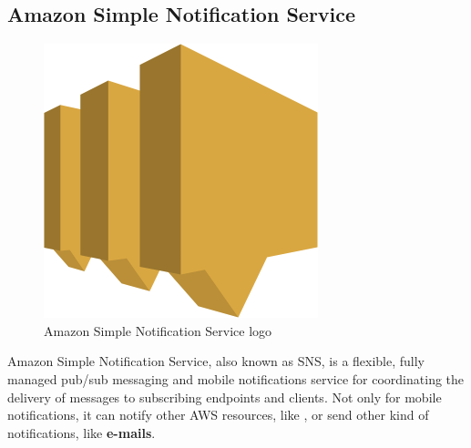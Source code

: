 \subsection*{Amazon Simple Notification Service} \label{sns}
\begin{figure}[H]
\centering
\includegraphics[scale=0.1]{resources/sns-logo.png}
\caption{Amazon Simple Notification Service logo}
\end{figure}

Amazon Simple Notification Service\cite{sns}, also known as SNS, is a flexible, fully managed pub/sub messaging and mobile notifications service for coordinating the delivery of messages to subscribing endpoints and clients. Not only for mobile notifications, it can notify other AWS resources, like , or send other kind of notifications, like \textbf{e-mails}.





